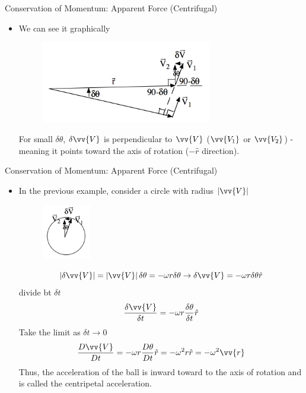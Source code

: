 \begin{frame}{Conservation of Momentum: Apparent Force (Centrifugal)}

\begin{itemize}
	\item We can see it graphically
	\begin{figure}
		\includegraphics[width=0.7\textwidth]{centrifugal2}	
	\end{figure}
	For small $\delta \theta$, $\delta \vv{V}$ is perpendicular to $\vv{V}$ ($\vv{V_1}$ or $\vv{V_2}$) - meaning it points toward the axis of rotation ($-\hat r$ direction).
\end{itemize}
\end{frame}
\begin{frame}{Conservation of Momentum: Apparent Force (Centrifugal)}

\begin{itemize}
	\item In the previous example, consider a circle with radius $\left|\vv{V}\right|$
	\begin{figure}
		\includegraphics[width=0.2\textwidth]{centrifugal3}	
	\end{figure}
	$$\left|\delta \vv{V}\right| = \left|\vv{V}\right|\delta \theta = -\omega r \delta \theta \rightarrow \delta \vv{V} = -\omega r \delta \theta \hat r$$
	divide bt $\delta t$
	$$\frac{\delta \vv{V}}{\delta t} = -\omega r \frac{\delta \theta}{\delta t} \hat r$$
	Take the limit as $\delta t\rightarrow 0$
	$$\frac{D\vv{V}}{Dt} = -\omega r \frac{D\theta}{Dt} \hat r = -\omega^2 r \hat r = -\omega^2 \vv{r}$$ 
	Thus, the acceleration of the ball is inward toward to the axis of rotation and is called the centripetal acceleration.
\end{itemize}
\end{frame}
